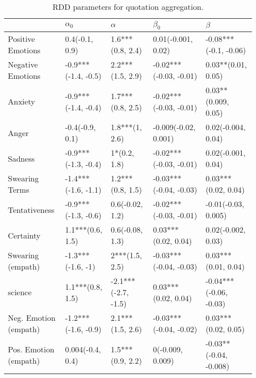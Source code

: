 \begin{table}[h]\centering
\caption{RDD parameters for quotation aggregation.}
	\label{fig: Quotation_1}
\begin{adjustbox}{width=\linewidth, center}
	\begin{tabular}{lllll}
	\toprule
	{} &           $\alpha_0$ &             $\alpha$ &               $\beta_0$ &                 $\beta$ \\
	\midrule
	Positive Emotions     &       0.4(-0.1, 0.9) &     1.6***(0.8, 2.4) &      0.01(-0.001, 0.02) &   -0.08***(-0.1, -0.06) \\
	Negative Emotions     &  -0.9***(-1.4, -0.5) &     2.2***(1.5, 2.9) &  -0.02***(-0.03, -0.01) &      0.03**(0.01, 0.05) \\
	Anxiety               &  -0.9***(-1.4, -0.4) &     1.7***(0.8, 2.5) &  -0.02***(-0.03, -0.01) &     0.03**(0.009, 0.05) \\
	Anger                 &      -0.4(-0.9, 0.1) &       1.8***(1, 2.6) &    -0.009(-0.02, 0.001) &      0.02(-0.004, 0.04) \\
	Sadness               &  -0.9***(-1.3, -0.4) &         1*(0.2, 1.8) &  -0.02***(-0.03, -0.01) &      0.02(-0.001, 0.04) \\
	Swearing Terms        &  -1.4***(-1.6, -1.1) &     1.2***(0.8, 1.5) &  -0.03***(-0.04, -0.03) &     0.03***(0.02, 0.04) \\
	Tentativeness         &  -0.9***(-1.3, -0.6) &      0.6(-0.02, 1.2) &  -0.02***(-0.03, -0.01) &     -0.01(-0.03, 0.005) \\
	Certainty             &     1.1***(0.6, 1.5) &      0.6(-0.08, 1.3) &     0.03***(0.02, 0.04) &      0.02(-0.002, 0.03) \\
	Swearing (empath)     &    -1.3***(-1.6, -1) &       2***(1.5, 2.5) &  -0.03***(-0.04, -0.03) &     0.03***(0.01, 0.04) \\
	science               &     1.1***(0.8, 1.5) &  -2.1***(-2.7, -1.5) &     0.03***(0.02, 0.04) &  -0.04***(-0.06, -0.03) \\
	Neg. Emotion (empath) &  -1.2***(-1.6, -0.9) &     2.1***(1.5, 2.6) &  -0.03***(-0.04, -0.02) &     0.03***(0.02, 0.05) \\
	Pos. Emotion (empath) &     0.004(-0.4, 0.4) &     1.5***(0.9, 2.2) &        0(-0.009, 0.009) &  -0.03**(-0.04, -0.008) \\
	\bottomrule
	\end{tabular}
	
\end{adjustbox}
	\end{table}

